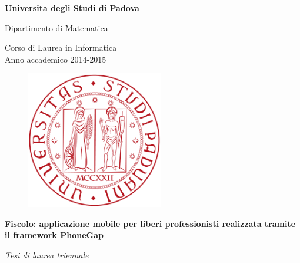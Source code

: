 \documentclass{article}
\begin{document}
\begin{titlepage}
\begin{center}

\begin{LARGE}
\textbf{Universita degli Studi di Padova} \\
\end{LARGE}

\vspace{10pt}

\begin{large}
Dipartimento di Matematica \\
\end{large}

\vspace{10pt}

\begin{large}
Corso di Laurea in Informatica \\
Anno accademico 2014-2015
\end{large}

\vspace{30pt}

\begin{figure}[htbp]
\begin{center}
\includegraphics[height=6cm]{images/logo-unipd.png}
\end{center}
\end{figure}

\vspace{20pt}

\begin{LARGE}
\begin{center}
\textbf{Fiscolo: applicazione mobile per liberi professionisti realizzata tramite
il framework PhoneGap}
\end{center}
\end{LARGE}

\vspace{10pt}

\begin{large}
\textit{Tesi di laurea triennale}
\end{large}


\end{center}
\end{titlepage}
\end{document}
